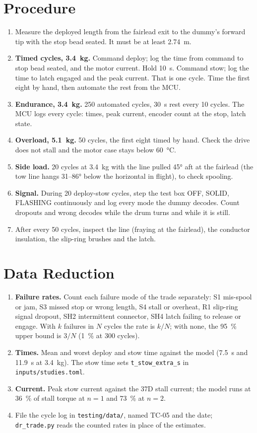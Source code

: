 \documentclass[final]{dbfdoc}
\begin{document}
\section{Procedure}
\begin{enumerate}
\item Measure the deployed length from the fairlead exit to the dummy's forward tip with the stop bead seated. It must be at least 2.74~m.
\item \textbf{Timed cycles, 3.4~kg.} Command deploy; log the time from command to stop bead seated, and the motor current. Hold 10~s. Command stow; log the time to latch engaged and the peak current. That is one cycle. Time the first eight by hand, then automate the rest from the MCU.
\item \textbf{Endurance, 3.4~kg.} 250 automated cycles, 30~s rest every 10 cycles. The MCU logs every cycle: times, peak current, encoder count at the stop, latch state.
\item \textbf{Overload, 5.1~kg.} 50 cycles, the first eight timed by hand. Check the drive does not stall and the motor case stays below 60~°C.
\item \textbf{Side load.} 20 cycles at 3.4~kg with the line pulled 45° aft at the fairlead (the tow line hangs 31--86° below the horizontal in flight), to check spooling.
\item \textbf{Signal.} During 20 deploy-stow cycles, step the test box OFF, SOLID, FLASHING continuously and log every mode the dummy decodes. Count dropouts and wrong decodes while the drum turns and while it is still.
\item After every 50 cycles, inspect the line (fraying at the fairlead), the conductor insulation, the slip-ring brushes and the latch.
\end{enumerate}

\section{Data Reduction}
\begin{enumerate}
\item \textbf{Failure rates.} Count each failure mode of the trade separately: S1 mis-spool or jam, S3 missed stop or wrong length, S4 stall or overheat, R1 slip-ring signal dropout, SH2 intermittent connector, SH4 latch failing to release or engage. With $k$ failures in $N$ cycles the rate is $k/N$; with none, the 95~\% upper bound is $3/N$ (1~\% at 300 cycles).
\item \textbf{Times.} Mean and worst deploy and stow time against the model (7.5~s and 11.9~s at 3.4~kg). The stow time sets \texttt{t\_stow\_extra\_s} in \texttt{inputs/studies.toml}.
\item \textbf{Current.} Peak stow current against the 37D stall current; the model runs at 36~\% of stall torque at $n = 1$ and 73~\% at $n = 2$.
\item File the cycle log in \texttt{testing/data/}, named TC-05 and the date; \texttt{dr\_trade.py} reads the counted rates in place of the estimates.
\end{enumerate}
\end{document}
